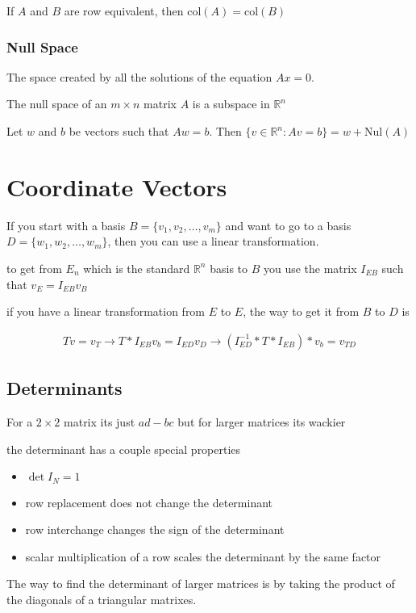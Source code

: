 \documentclass[fleqn]{report}
\newcommand{\col}{\textrm{col}}
\newcommand{\equations} [1] {
\begin{gather*}
#1
\end{gather*}
}
\begin{document}
If $A$ and $B$ are row equivalent, then $\col(A) = \col(B)$

\subsection{Null Space}
The space created by all the solutions of the equation $Ax = 0$. 

The null space of an $m \times n$ matrix $A$ is a subspace in $\mathbb{R}^n$

Let $w$ and $b$ be vectors such that $Aw = b$. Then $\{ v \in \mathbb{R}^n : Av = b\} = w + \textrm{Nul}(A)$


\chapter{Coordinate Vectors}
If you start with a basis $B = \{ v_1, v_2, \ldots, v_m \}$ and want to go to a basis 
$D = \{ w_1, w_2, \ldots, w_m \}$, then you can use a linear transformation.

to get from $E_n$ which is the standard $\mathbb{R}^n$ basis to $B$ you use the 
matrix $I_{EB}$ such that $v_E = I_{EB} v_B$

if you have a linear transformation from $E$ to $E$, the way to get it from $B$ to $D$ is 

\equations{
	T v = v_T 
	\rightarrow 
	T * I_{EB} v_b = I_{ED} v_D
	\rightarrow 
	(I_{ED}^{-1} * T * I_{EB}) * v_b = v_{TD}
}

\section{Determinants}
For a $2 \times 2$ matrix its just $ad - bc$ but for larger matrices its wackier 

the determinant has a couple special properties 

\begin{itemize}
	\item
		$\det I_N = 1$
	\item
		row replacement does not change the determinant
	\item
		row interchange changes the sign of the determinant
	\item
		scalar multiplication of a row scales the determinant by the same factor 
\end{itemize}

The way to find the determinant of larger matrices is by taking the product of the diagonals of a triangular matrixes. 
\end{document}
